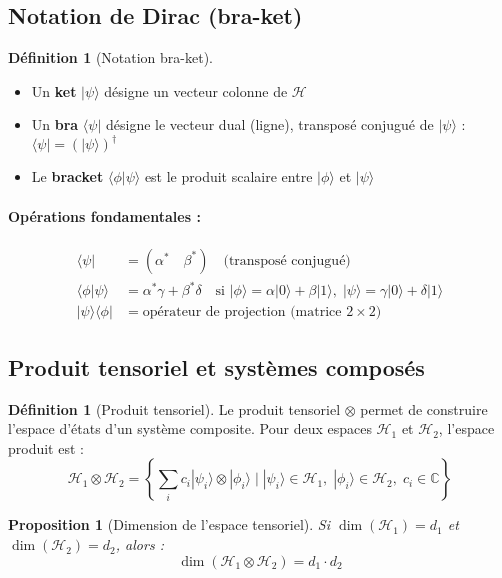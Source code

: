 \documentclass[12pt,a4paper]{article}
\newtheorem{proposition}[theorem]{Proposition}
\theoremstyle{definition}
\newtheorem{definition}[theorem]{Définition}
\theoremstyle{remark}
\begin{document}
\subsection{Notation de Dirac (bra-ket)}

\begin{definition}[Notation bra-ket]
\begin{itemize}
    \item Un \textbf{ket} $|\psi\rangle$ désigne un vecteur colonne de $\mathcal{H}$
    \item Un \textbf{bra} $\langle\psi|$ désigne le vecteur dual (ligne), transposé conjugué de $|\psi\rangle$ : $\langle\psi| = (|\psi\rangle)^\dagger$
    \item Le \textbf{bracket} $\langle\phi|\psi\rangle$ est le produit scalaire entre $|\phi\rangle$ et $|\psi\rangle$
\end{itemize}
\end{definition}

\paragraph{Opérations fondamentales :}
\begin{align}
\langle\psi| &= (\alpha^* \quad \beta^*) \quad \text{(transposé conjugué)} \\
\langle\phi|\psi\rangle &= \alpha^*\gamma + \beta^*\delta \quad \text{si } |\phi\rangle = \alpha|0\rangle + \beta|1\rangle, \; |\psi\rangle = \gamma|0\rangle + \delta|1\rangle \\
|\psi\rangle\langle\phi| &= \text{opérateur de projection (matrice } 2\times 2\text{)}
\end{align}

\subsection{Produit tensoriel et systèmes composés}

\begin{definition}[Produit tensoriel]
Le produit tensoriel $\otimes$ permet de construire l'espace d'états d'un système composite. Pour deux espaces $\mathcal{H}_1$ et $\mathcal{H}_2$, l'espace produit est :
\[
\mathcal{H}_1 \otimes \mathcal{H}_2 = \left\{ \sum_i c_i |\psi_i\rangle \otimes |\phi_i\rangle \;\Big|\; |\psi_i\rangle \in \mathcal{H}_1, \; |\phi_i\rangle \in \mathcal{H}_2, \; c_i \in \mathbb{C} \right\}
\]
\end{definition}

\begin{proposition}[Dimension de l'espace tensoriel]
Si $\dim(\mathcal{H}_1) = d_1$ et $\dim(\mathcal{H}_2) = d_2$, alors :
\[
\dim(\mathcal{H}_1 \otimes \mathcal{H}_2) = d_1 \cdot d_2
\]
\end{proposition}
\end{document}
